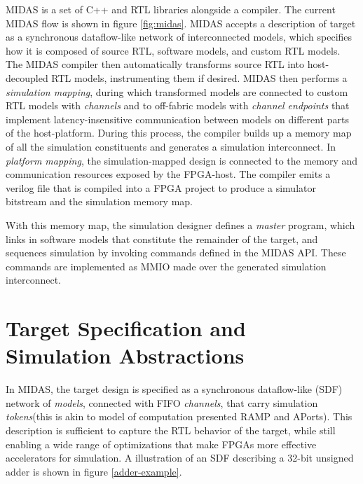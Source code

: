 MIDAS is a set of C++ and RTL libraries alongside a compiler. The current MIDAS
flow is shown in figure \ref{fig:midas}. MIDAS accepts a description of target
as a synchronous dataflow-like network of interconnected models, which
specifies how it is composed of source RTL, software models, and custom RTL
models. The MIDAS compiler then automatically transforms source RTL into
host-decoupled RTL models, instrumenting them if desired. MIDAS then performs a
\emph{simulation mapping}, during which transformed models are connected to
custom RTL models with \emph{channels} and to off-fabric models with
\emph{channel endpoints} that implement latency-insensitive communication
between models on different parts of the host-platform. During this process,
the compiler builds up a memory map of all the simulation constituents and
generates a simulation interconnect. In \emph{platform mapping}, the
simulation-mapped design is connected to the memory and communication resources
exposed by the FPGA-host. The compiler emits a verilog file that is compiled
into a FPGA project to produce a simulator bitstream and the simulation memory
map.

With this memory map, the simulation designer defines a \emph{master} program,
which links in software models that constitute the remainder of the target, and
sequences simulation by invoking commands defined in the MIDAS API. These
commands are implemented as MMIO made over the generated simulation
interconnect.

\section{Target Specification and Simulation Abstractions}\label{sec:sdf}

In MIDAS, the target design is specified as a synchronous dataflow-like (SDF)
network of \emph{models}, connected with FIFO \emph{channels}, that carry
simulation \emph{tokens}(this is akin to model of computation presented
RAMP\cite{ramp} and APorts\cite{APortNetworks}). This description is sufficient
to capture the RTL behavior of the target, while still enabling a wide range of
optimizations that make FPGAs more effective accelerators for simulation.  A
illustration of an SDF describing a 32-bit unsigned adder is shown in figure
\ref{adder-example}.


